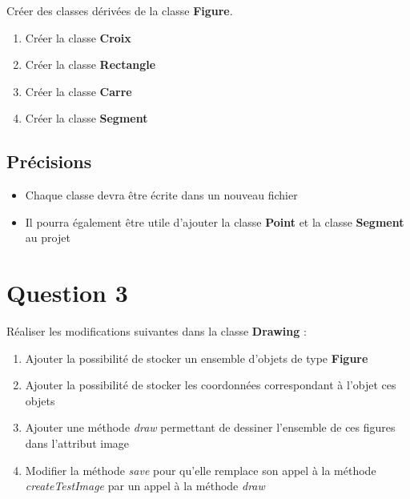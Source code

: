 \documentclass[
	12pt, %
]{fphw}
\begin{document}
\begin{problem}
	Créer des classes dérivées de la classe \textbf{Figure}.

\begin{enumerate}
	\item Créer la classe \textbf{Croix}
	\item Créer la classe \textbf{Rectangle}
	\item Créer la classe \textbf{Carre}
	\item Créer la classe \textbf{Segment}
\end{enumerate}

\end{problem}


\subsection*{Précisions}

\begin{itemize}
	\item Chaque classe devra être écrite dans un nouveau fichier
	\item Il pourra également être utile d'ajouter la classe \textbf{Point} et la classe \textbf{Segment} au projet
\end{itemize}


\section*{Question 3}

\begin{problem}

	Réaliser les modifications suivantes dans la classe \textbf{Drawing} :

	\begin{enumerate}
		\item Ajouter la possibilité de stocker un ensemble d'objets de type \textbf{Figure}
		\item Ajouter la possibilité de stocker les coordonnées correspondant à l'objet ces objets
		\item Ajouter une méthode \emph{draw} permettant de dessiner l'ensemble de ces figures dans l'attribut image
		\item Modifier la méthode \emph{save} pour qu'elle remplace son appel à la méthode \emph{createTestImage} par un appel à la méthode \emph{draw}
	\end{enumerate}

\end{problem}
\end{document}
